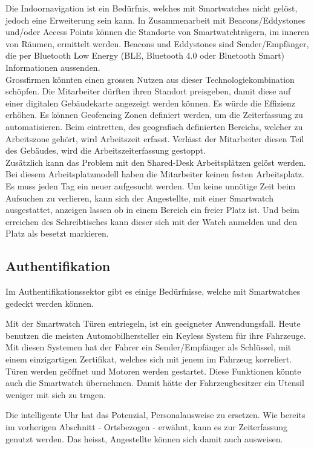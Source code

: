 Die Indoornavigation ist ein Bedürfnis, welches mit Smartwatches nicht gelöst, jedoch eine Erweiterung sein kann. In Zusammenarbeit mit Beacons/Eddystones und/oder Access Points können die Standorte von Smartwatchträgern, im inneren von Räumen, ermittelt werden. Beacons und Eddystones sind Sender/Empfänger, die per Bluetooth Low Energy (\gls{BLE}, Bluetooth 4.0 oder  Bluetooth Smart) Informationen aussenden.\\
Grossfirmen könnten einen grossen Nutzen aus dieser Technologiekombination schöpfen. Die Mitarbeiter dürften ihren Standort preisgeben, damit diese auf einer digitalen Gebäudekarte angezeigt werden können. Es würde die Effizienz erhöhen. Es können Geofencing Zonen definiert werden, um die Zeiterfassung zu automatisieren. Beim eintretten, des geografisch definierten Bereichs, welcher zu Arbeitszone gehört, wird Arbeitszeit erfasst. Verlässt der Mitarbeiter diesen Teil des Gebäudes, wird die Arbeitszeiterfassung gestoppt.\\
Zusätzlich kann das Problem mit den Shared-Desk Arbeitsplätzen gelöst werden. Bei diesem Arbeitsplatzmodell haben die Mitarbeiter keinen festen Arbeitsplatz. Es muss jeden Tag ein neuer aufgesucht werden. Um keine unnötige Zeit beim Aufsuchen zu verlieren, kann sich der Angestellte, mit einer Smartwatch ausgestattet, anzeigen lassen ob in einem Bereich ein freier Platz ist. Und beim erreichen des Schreibtisches kann dieser sich mit der Watch anmelden und den Platz als besetzt markieren.
\newpage

\subsection{Authentifikation}
Im Authentifikationssektor gibt es einige Bedürfnisse, welche mit Smartwatches gedeckt werden können.

Mit der Smartwatch Türen entriegeln, ist ein geeigneter Anwendungsfall. Heute benutzen die meisten Automobilhersteller ein Keyless System für ihre Fahrzeuge. Mit diesen Systemen hat der Fahrer ein Sender/Empfänger als Schlüssel, mit einem einzigartigen Zertifikat, welches sich mit jenem im Fahrzeug korreliert. Türen werden geöffnet und Motoren werden gestartet. Diese Funktionen könnte auch die Smartwatch übernehmen. Damit hätte der Fahrzeugbesitzer ein Utensil weniger mit sich zu tragen.

Die intelligente Uhr hat das Potenzial, Personalausweise zu ersetzen. Wie bereits im vorherigen Abschnitt - Ortsbezogen - erwähnt, kann es zur Zeiterfassung genutzt werden. Das heisst, Angestellte können sich damit auch ausweisen.


